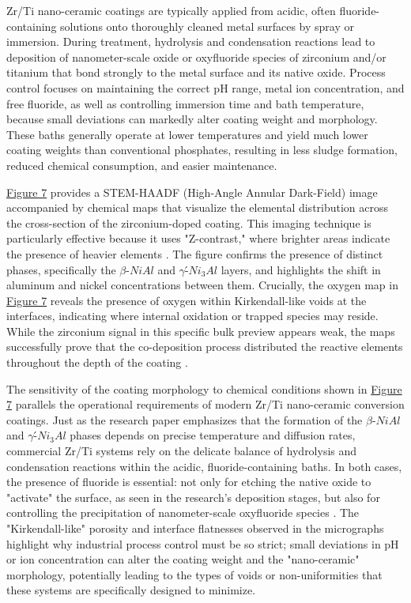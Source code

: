 \documentclass[12pt]{article}
\begin{document}
            Zr/Ti nano-ceramic coatings are typically applied from acidic, often fluoride-containing solutions onto thoroughly cleaned metal surfaces by spray or immersion. During treatment, hydrolysis and condensation reactions lead to deposition of nanometer-scale oxide or oxyfluoride species of zirconium and/or titanium that bond strongly to the metal surface and its native oxide. Process control focuses on maintaining the correct pH range, metal ion concentration, and free fluoride, as well as controlling immersion time and bath temperature, because small deviations can markedly alter coating weight and morphology. These baths generally operate at lower temperatures and yield much lower coating weights than conventional phosphates, resulting in less sludge formation, reduced chemical consumption, and easier maintenance.

            \hyperref[ceramic]{Figure 7} provides a STEM-HAADF (High-Angle Annular Dark-Field) image accompanied by chemical maps that visualize the elemental distribution across the cross-section of the zirconium-doped coating. This imaging technique is particularly effective because it uses "Z-contrast," where brighter areas indicate the presence of heavier elements \autocite{horcher_advanced_2022}. The figure confirms the presence of distinct phases, specifically the $\beta$-$NiAl$ and $\gamma$\'-$Ni_{3}Al$ layers, and highlights the shift in aluminum and nickel concentrations between them. Crucially, the oxygen map in \hyperref[ceramic]{Figure 7} reveals the presence of oxygen within Kirkendall-like voids at the interfaces, indicating where internal oxidation or trapped species may reside. While the zirconium signal in this specific bulk preview appears weak, the maps successfully prove that the co-deposition process distributed the reactive elements throughout the depth of the coating \autocite{horcher_advanced_2022}. 
            
            The sensitivity of the coating morphology to chemical conditions shown in \hyperref[ceramic]{Figure 7} parallels the operational requirements of modern Zr/Ti nano-ceramic conversion coatings. Just as the research paper emphasizes that the formation of the $\beta$-$NiAl$ and $\gamma$\'-$Ni_{3}Al$ phases depends on precise temperature and diffusion rates, commercial Zr/Ti systems rely on the delicate balance of hydrolysis and condensation reactions within the acidic, fluoride-containing baths. In both cases, the presence of fluoride is essential: not only for etching the native oxide to "activate" the surface, as seen in the research's deposition stages, but also for controlling the precipitation of nanometer-scale oxyfluoride species \autocite{horcher_advanced_2022}. The "Kirkendall-like" porosity and interface flatnesses observed in the micrographs highlight why industrial process control must be so strict; small deviations in pH or ion concentration can alter the coating weight and the "nano-ceramic" morphology, potentially leading to the types of voids or non-uniformities that these systems are specifically designed to minimize.
\end{document}
